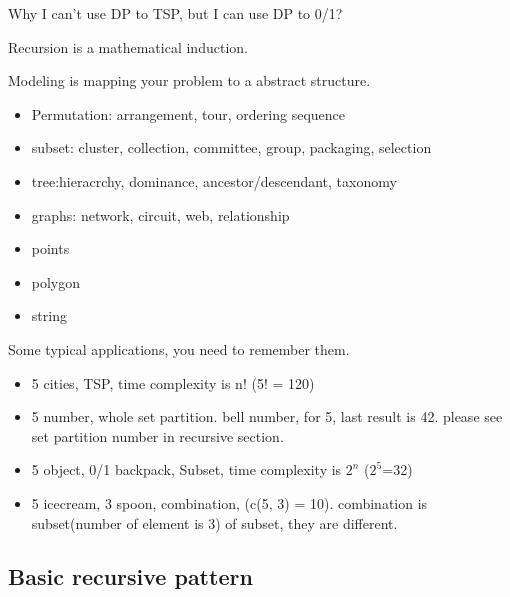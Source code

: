 \documentclass[a4paper,11pt,twoside]{book}
\begin{document}
\par Why I can't use DP to TSP, but I can use DP to 0/1?  

\par Recursion is a mathematical induction. 

\par Modeling is mapping your problem to a abstract structure.

\begin{itemize}
	\item Permutation: arrangement, tour, ordering sequence
	\item subset: cluster, collection, committee, group, packaging, selection
	\item tree:hieracrchy, dominance, ancestor/descendant, taxonomy
	\item graphs: network, circuit, web, relationship
	\item points
	\item polygon
	\item string 
\end{itemize}

\par Some typical applications, you need to remember them.
\begin{itemize}
	\item 5 cities, TSP, time complexity is n! (5! = 120)
	
	\item 5 number, whole set partition.  bell number, for 5, last result is 42. please see set partition number in recursive section.
	
	\item 5 object, 0/1 backpack,  Subset, time complexity is $2^n$ ($2^5$=32)
	
	\item 5 icecream, 3 spoon,  combination, (c(5, 3) = 10). combination is subset(number of element is 3) of subset, they are different. 
	
\end{itemize}
	
	
\subsection{Basic recursive pattern}
\end{document}
